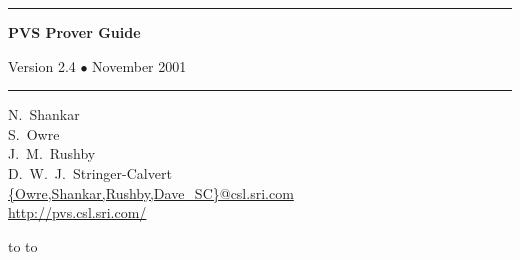 \documentclass[12pt,twoside]{book}
\begin{document}

\newenvironment{display}{\begin{alltt}\small\tt\vspace{0.3\baselineskip}}{\vspace{0.3\baselineskip}\end{alltt}}
\newcommand{\normtt}[1]{{\obeyspaces \texttt{#1 }}}
\newenvironment{pagegroup}{}{}
\newenvironment{tdisplay}{\begin{alltt}\footnotesize\tt\vspace{0.3\baselineskip}}{\vspace{0.3\baselineskip}\end{alltt}}

%
\newcommand{\Infrule}[3]{
{{\displaystyle\strut #1}\over{\displaystyle\strut #2}}\;\mbox{\scriptsize$\bf #3$}
}
\newcommand{\imp}{\supset}
\newcommand{\pair}[1]{\langle #1 \rangle}
\newcommand{\seq}[2]{#1_{1} \ldots #1_{#2}}  
\newcommand{\implies}{\supset}

\def\id#1{\hbox\texttt{#1}} %
%
%
\vspace{4in}

\begin{titlepage}
\vspace*{1in}
\noindent
\rule[1pt]{\textwidth}{2pt}
\begin{center}
\textbf{\pvstitle PVS Prover Guide}
\end{center}
\begin{flushright}
{\Large Version 2.4 {\smaller$\bullet$} November 2001}
\end{flushright}
\rule[1in]{\textwidth}{2pt}
\vspace*{2in}
\begin{flushleft}
N.~Shankar\\
S.~Owre\\
J.~M.~Rushby\\
D.~W.~J.~Stringer-Calvert\\
{\smaller\url{{Owre,Shankar,Rushby,Dave_SC}@csl.sri.com}}\\
{\smaller\url{http://pvs.csl.sri.com/}}
\end{flushleft}
\vspace*{1in}
\vbox{\hbox to %
\hbox to }
\end{titlepage}
\end{document}
